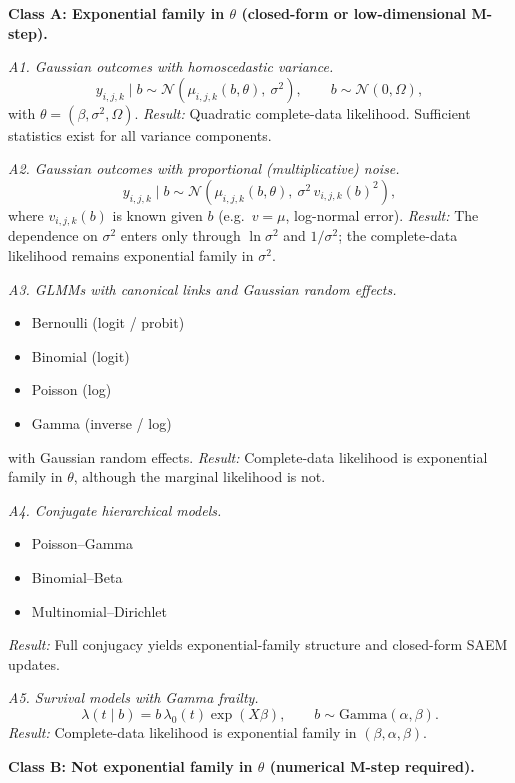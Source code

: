 \documentclass[12pt]{article}
\begin{document}
\medskip
\noindent
\textbf{Class A: Exponential family in \(\theta\) (closed-form or low-dimensional M-step).}

\medskip
\noindent
\emph{A1. Gaussian outcomes with homoscedastic variance.}
\[
y_{i,j,k} \mid b \sim \mathcal{N}(\mu_{i,j,k}(b,\theta),\ \sigma^2),
\qquad
b\sim \mathcal{N}(0,\Omega),
\]
with \(\theta=(\beta,\sigma^2,\Omega)\).
\emph{Result:} Quadratic complete-data likelihood. Sufficient statistics exist for all variance components.

\medskip
\noindent
\emph{A2. Gaussian outcomes with proportional (multiplicative) noise.}
\[
y_{i,j,k} \mid b \sim \mathcal{N}\!\left(\mu_{i,j,k}(b,\theta),\ \sigma^2\,v_{i,j,k}(b)^2\right),
\]
where \(v_{i,j,k}(b)\) is known given \(b\) (e.g.\ \(v=\mu\), log-normal error).
\emph{Result:} The dependence on \(\sigma^2\) enters only through \(\ln\sigma^2\) and \(1/\sigma^2\); the complete-data likelihood remains exponential family in \(\sigma^2\).

\medskip
\noindent
\emph{A3. GLMMs with canonical links and Gaussian random effects.}
\begin{itemize}
\item Bernoulli (logit / probit)
\item Binomial (logit)
\item Poisson (log)
\item Gamma (inverse / log)
\end{itemize}
with Gaussian random effects.
\emph{Result:} Complete-data likelihood is exponential family in \(\theta\), although the marginal likelihood is not.

\medskip
\noindent
\emph{A4. Conjugate hierarchical models.}
\begin{itemize}
\item Poisson--Gamma
\item Binomial--Beta
\item Multinomial--Dirichlet
\end{itemize}
\emph{Result:} Full conjugacy yields exponential-family structure and closed-form SAEM updates.

\medskip
\noindent
\emph{A5. Survival models with Gamma frailty.}
\[
\lambda(t\mid b)=b\,\lambda_0(t)\exp(X\beta),
\qquad b\sim\text{Gamma}(\alpha,\beta).
\]
\emph{Result:} Complete-data likelihood is exponential family in \((\beta,\alpha,\beta)\).

\medskip
\noindent
\textbf{Class B: Not exponential family in \(\theta\) (numerical M-step required).}
\end{document}
